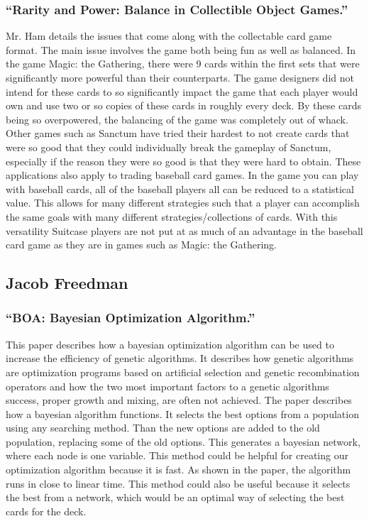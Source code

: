 \documentclass[12pt, letterpaper]{article}
\begin{document}
\subsubsection{\enquote{Rarity and Power: Balance in Collectible Object Games.}}

Mr. Ham details the issues that come along with the collectable card game format.
The main issue involves the game both being fun as well as balanced.
In the game Magic: the Gathering,
there were 9 cards within the first sets that were significantly more powerful than their counterparts.
The game designers did not intend for these cards to so
significantly impact the game that each player would own and use two or so copies of these cards in roughly every deck.
By these cards being so overpowered, the balancing of the game was completely out of whack.
Other games such as Sanctum have tried their hardest to not create cards
that were so good that they could individually break the gameplay of
Sanctum, especially if the reason they were so good is that they were hard to obtain.
These applications also apply to trading baseball card games.
In the game you can play with baseball cards, all of the baseball players all can be reduced to a statistical value.
This allows for many different strategies such that a player can accomplish the same
goals with many different strategies/collections of cards.
With this versatility Suitcase players are not put at as much
of an advantage in the baseball card game as they are in games such as Magic: the Gathering.

\subsection{Jacob Freedman}

\subsubsection{\enquote{BOA: Bayesian Optimization Algorithm.}}

This paper describes how a bayesian optimization algorithm can be used to increase the efficiency of genetic algorithms.
It describes how genetic algorithms are optimization programs
based on artificial selection and genetic recombination operators
and how the two most important factors to a genetic algorithms success, proper growth and mixing, are often not achieved.
The paper describes how a bayesian algorithm functions.
It selects the best options from a population using any searching method.
Than the new options are added to the old population, replacing some of the old options.
This generates a bayesian network, where each node is one variable.
This method could be helpful for creating our optimization algorithm because it is fast.
As shown in the paper, the algorithm runs in close to linear time.
This method could also be useful because it selects the best from a network,
which would be an optimal way of selecting the best cards for the deck.
\end{document}
